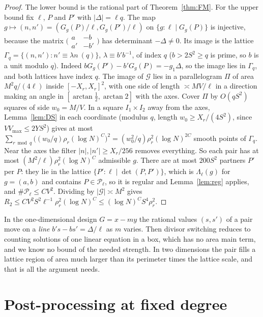 \documentclass[11pt]{amsart}
\theoremstyle{definition}
\newcommand{\cG}{\mathcal{G}}
\newcommand{\cP}{\mathcal{P}}
\newcommand{\VM}{V_{\max}}
\newcommand{\Xr}{X_{r}}
\newcommand{\rr}{\rho_r}
\begin{document}
\begin{proof}
The lower bound is the rational part of Theorem~\ref{thm:FM}. For the upper bound fix $\ell$, $P$ and $P'$ with $|\Delta|=\ell q$. The map
$g\mapsto(n,n')=(G_g(P)/\ell,G_g(P')/\ell)$ on $\{g:\ell\mid G_g(P)\}$ is injective, because the matrix $\bigl(\begin{smallmatrix}a&-b\\a'&-b'\end{smallmatrix}\bigr)$
has determinant $-\Delta\ne0$. Its image is the lattice $\Gamma_q=\{(n,n'):n'\equiv\lambda n\ (q)\}$, $\lambda\equiv b'b^{-1}$, of index $q$
($b>2S^2\ge q$ is prime, so $b$ is a unit modulo $q$). Indeed $bG_g(P')-b'G_g(P)=-g_1\Delta$, so the image lies in $\Gamma_q$, and both lattices have index $q$.
The image of $\cG$ lies in a parallelogram $\Pi$ of area $M^2q/(4\ell)$ inside $[-\Xr,\Xr]^2$, with one side of length $\asymp MV/\ell$ in a direction
making an angle in $[\arctan\frac12,\arctan2]$ with the axes. Cover $\Pi$ by $O(qS^2)$ squares of side $w_0=M/V$. In a square $I_1\times I_2$
away from the axes, Lemma~\ref{lem:DS} in each coordinate (modulus $q$, length $w_0\ge\Xr/(4S^2)$, since $V\VM\le2YS^2$) gives at most
$\sum_{r\bmod q}\bigl((w_0/q)\rr(\log N)^C\bigr)^2=(w_0^2/q)\rr^2(\log N)^{2C}$ smooth points of $\Gamma_q$. Near the axes the filter
$|n|,|n'|\ge\Xr/256$ removes everything. So each pair has at most $(M^2/\ell)\rr^2(\log N)^C$ admissible $g$. There are at most $200S^2$
partners $P'$ per $P$: they lie in the lattice $\{P':\ell\mid\det(P,P')\}$, which is $\Lambda_\ell(g)$ for $g=(a,b)$ and contains $P\in\cP_\ell$, so it is regular and Lemma~\ref{lem:reg} applies, and $\#\cP_\ell\le CV^2$. Dividing by $|\cG|\asymp M^2$ gives
$R_2\le CV^2S^2\ell^{-1}\rr^2(\log N)^C\le(\log N)^CS^4\rr^2$.
\end{proof}

\noindent In the one-dimensional design $G=x-my$ the rational values $(s,s')$ of a pair move on a \emph{line}
$b's-bs'=\Delta/\ell$ as $m$ varies. Then divisor switching reduces to counting solutions of one linear equation in a box,
which has no area main term, and we know no bound of the needed strength. In two dimensions the pair fills a lattice region of
area much larger than its perimeter times the lattice scale, and that is all the argument needs.

\section{Post-processing at fixed degree}\label{sec:lv6}
\end{document}
